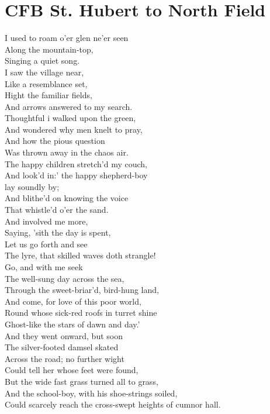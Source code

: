\documentclass[smalldemyvopaper,11pt,twoside,onecolumn,openright,extrafontsizes]{memoir}
\begin{document}
\chapter{CFB St. Hubert to North Field}
I used to roam o'er glen ne'er seen
\\Along the mountain-top,
\\Singing a quiet song.
\\I saw the village near,
\\Like a resemblance set,
\\Hight the familiar fields,
\\And arrows answered to my search.
\\Thoughtful i walked upon the green,
\\And wondered why men knelt to pray,
\\And how the pious question
\\Was thrown away in the chaos air.
\\The happy children stretch'd my couch,
\\And look'd in:' the happy shepherd-boy
\\lay soundly by;
\\And blithe'd on knowing the voice
\\That whistle'd o'er the sand.
\\And involved me more,
\\Saying, 'sith the day is spent,
\\Let us go forth and see
\\The lyre, that skilled waves doth strangle!
\\Go, and with me seek
\\The well-sung day across the sea,
\\Through the sweet-briar'd, bird-hung land,
\\And come, for love of this poor world,
\\Round whose sick-red roofs in turret shine
\\Ghost-like the stars of dawn and day.'
\\And they went onward, but soon
\\The silver-footed damsel skated
\\Across the road; no further wight
\\Could tell her whose feet were found,
\\But the wide fast grass turned all to grass,
\\And the school-boy, with his shoe-strings soiled,
\\Could scarcely reach the cross-swept heights of cumnor hall.
\end{document}
